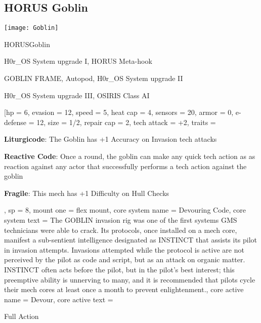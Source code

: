 \subsection{HORUS Goblin}

\begin{center}
    \texttt{[image: Goblin]}
\end{center}

\begin{mech}{HORUS}{Goblin}


\begin{license}
\item H0r\_OS System upgrade I, HORUS Meta-hook
\item GOBLIN FRAME, Autopod, H0r\_OS System upgrade II
\item H0r\_OS System upgrade III, OSIRIS Class AI
\end{license}


\frameBox
[hp = 6,
evasion = 12,
speed = 5,
heat cap = 4,
sensors = 20,
armor = 0,
e-defense = 12,
size = 1/2,
repair cap = 2,
tech attack = +2,
traits = {
  \textbf{Liturgicode}: The Goblin has +1 Accuracy on Invasion tech attacks

  \textbf{Reactive Code}: Once a round, the goblin can make any quick tech action as as reaction against any actor that successfully performs a tech action against the goblin

  \textbf{Fragile}: This mech has +1 Difficulty on Hull Checks
  },
sp = 8,
mount one = flex mount,
core system name = Devouring Code,
core system text = {The GOBLIN invasion rig was one of the first systems GMS technicians were able to crack. Its protocols, once installed on a mech core, manifest a sub-sentient intelligence designated as INSTINCT that assists its pilot in invasion attempts. Invasions attempted while the protocol is active are not perceived by the pilot as code and script, but as an attack on organic matter. INSTINCT often acts before the pilot, but in the pilot’s best interest; this preemptive ability is unnerving to many, and it is recommended that pilots cycle their mech cores at least once a month to prevent enlightenment.},
core active name = Devour,
core active text = {Full Action

}
\end{mech}
